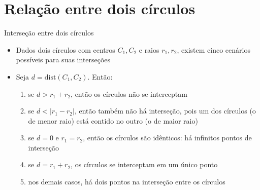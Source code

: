 \section{Relação entre dois círculos}

\begin{frame}[fragile]{Interseção entre dois círculos}

    \begin{itemize}
        \item Dados dois círculos com centros $C_1, C_2$ e raios $r_1, r_2$, existem cinco 
        cenários possíveis para suas interseções 
        \pause

        \item Seja $d = \mathrm{dist}(C_1, C_2)$. Então:
        \pause

        \begin{enumerate}
            \item se $d > r_1 + r_2$, então os círculos não se interceptam
        \pause
            \item se $d < |r_1 - r_2|$, então também não há interseção, pois um dos círculos 
                (o de menor raio) está contido no outro (o de maior raio)
        \pause
            \item se $d = 0$ e $r_1 = r_2$, então os círculos são idênticos: há infinitos pontos de 
                interseção
        \pause
            \item se $d = r_1 + r_2$, os círculos se interceptam em um único ponto
        \pause
            \item nos demais casos, há dois pontos na interseção entre os círculos
        \end{enumerate}

    \end{itemize}

\end{frame}

